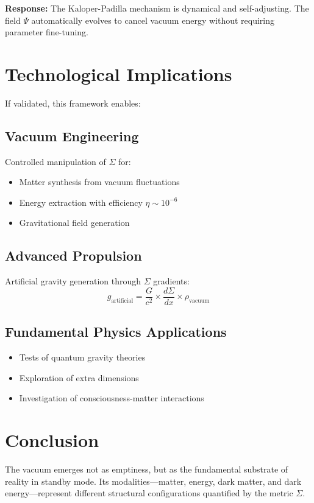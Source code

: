 \documentclass[12pt,a4paper]{article}
\newcommand{\structuring}{\Sigma}
\newcommand{\sequester}{\Psi}
\begin{document}
\textbf{Response:} The Kaloper-Padilla mechanism is dynamical and self-adjusting. The field $\sequester$ automatically evolves to cancel vacuum energy without requiring parameter fine-tuning.

\section{Technological Implications}

If validated, this framework enables:

\subsection{Vacuum Engineering}
Controlled manipulation of $\structuring$ for:
\begin{itemize}
\item Matter synthesis from vacuum fluctuations
\item Energy extraction with efficiency $\eta \sim 10^{-6}$
\item Gravitational field generation
\end{itemize}

\subsection{Advanced Propulsion}
Artificial gravity generation through $\structuring$ gradients:
\begin{equation}
g_{\text{artificial}} = \frac{G}{c^2} \times \frac{d\structuring}{dx} \times \rho_{\text{vacuum}}
\end{equation}

\subsection{Fundamental Physics Applications}
\begin{itemize}
\item Tests of quantum gravity theories
\item Exploration of extra dimensions
\item Investigation of consciousness-matter interactions
\end{itemize}

\section{Conclusion}

The vacuum emerges not as emptiness, but as the fundamental substrate of reality in standby mode. Its modalities—matter, energy, dark matter, and dark energy—represent different structural configurations quantified by the metric $\structuring$. 
\end{document}
